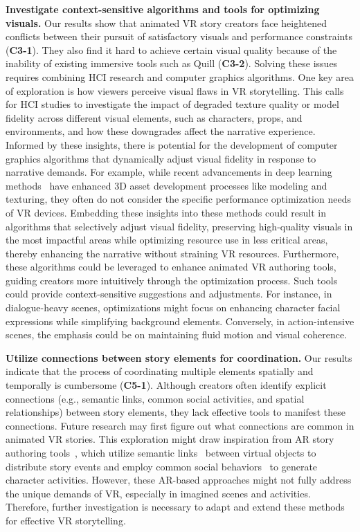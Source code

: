 \textbf{Investigate context-sensitive algorithms and tools for optimizing visuals.}
Our results show that animated VR story creators face heightened conflicts between their pursuit of satisfactory visuals and performance constraints (\textbf{C3-1}). They also find it hard to achieve certain visual quality because of the inability of existing immersive tools such as Quill (\textbf{C3-2}). 
Solving these issues requires combining HCI research and computer graphics algorithms. 
%
One key area of exploration is how viewers perceive visual flaws in VR storytelling. This calls for HCI studies to investigate the impact of degraded texture quality or model fidelity across different visual elements, such as characters, props, and environments, and how these downgrades affect the narrative experience.
%
Informed by these insights, there is potential for the development of computer graphics algorithms that dynamically adjust visual fidelity in response to narrative demands. For example, while recent advancements in deep learning methods~\cite{li2023generative, hirzle2023xrmeetai} have enhanced 3D asset development processes like modeling and texturing, they often do not consider the specific performance optimization needs of VR devices. Embedding these insights into these methods could result in algorithms that selectively adjust visual fidelity, preserving high-quality visuals in the most impactful areas while optimizing resource use in less critical areas, thereby enhancing the narrative without straining VR resources.
%
Furthermore, these algorithms could be leveraged to enhance animated VR authoring tools, guiding creators more intuitively through the optimization process. Such tools could provide context-sensitive suggestions and adjustments. For instance, in dialogue-heavy scenes, optimizations might focus on enhancing character facial expressions while simplifying background elements. Conversely, in action-intensive scenes, the emphasis could be on maintaining fluid motion and visual coherence.


\textbf{Utilize connections between story elements for coordination.}
Our results indicate that the process of coordinating multiple elements spatially and temporally is cumbersome (\textbf{C5-1}). Although creators often identify explicit connections (e.g., semantic links, common social activities, and spatial relationships) between story elements, they lack effective tools to manifest these connections. Future research may first figure out what connections are common in animated VR stories. This exploration might draw inspiration from AR story authoring tools~\cite{li2022ARSemantics, li2023humanscene, li2024anicraft, tong2024vistellar}, which utilize semantic links~\cite{li2022ARSemantics} between virtual objects to distribute story events and employ common social behaviors~\cite{li2023humanscene} to generate character activities. However, these AR-based approaches might not fully address the unique demands of VR, especially in imagined scenes and activities. 
Therefore, further investigation is necessary to adapt and extend these methods for effective VR storytelling.

